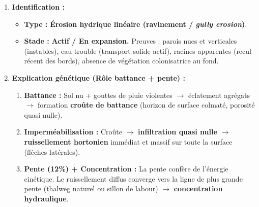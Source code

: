 \documentclass[11pt]{article}
\begin{document}
\begin{exoresolu}
\begin{enumerate}
\begin{itemize}
            \item \textbf{Surface :} Horizon supérieur (0 à -0,5 m) uniforme, colorié en orange (sol ferrugineux), sans végétation visible (« Sol nu »), mention « croûte de battance ».
            \item \textbf{Forme centrale :} Une incision symétrique en « V » large (environ 2 m au sommet) et profonde (1,5 m), aux parois nues, verticales à sub-verticales.
            \item \textbf{Fond :} Présence d'eau bleue trouble (chargée en sédiments) et de graviers/galets.
            \item   \textbf{Flèches bleues :} Convergence du ruissellement depuis les bords vers le centre (concentration).
            \item \textbf{Détails :} Racines d'arbres/herbes sectionnées et apparentes sur les bords supérieurs de la ravine (témoins du niveau initial du sol).
        \end{itemize}
        \item \textbf{Identification :}
        \begin{itemize}
            \item \textbf{Type :} \textbf{Érosion hydrique linéaire (ravinement / \emph{gully erosion})}.
            \item \textbf{Stade :} \textbf{Actif / En expansion.} Preuves : parois nues et verticales (instables), eau trouble (transport solide actif), racines apparentes (recul récent des bords), absence de végétation colonisatrice au fond.
        \end{itemize}
        \item \textbf{Explication génétique (Rôle battance + pente) :}
        \begin{enumerate}
            \item \textbf{Battance :} Sol nu + gouttes de pluie violentes $\rightarrow$ éclatement agrégats $\rightarrow$ formation \textbf{croûte de battance} (horizon de surface colmaté, porosité quasi nulle).
            \item \textbf{Imperméabilisation :} Croûte $\rightarrow$ \textbf{infiltration quasi nulle} $\rightarrow$ \textbf{ruissellement hortonien} immédiat et massif sur toute la surface (flèches latérales).
            \item \textbf{Pente (12\%) + Concentration :} La pente confère de l'énergie cinétique. Le ruissellement diffus converge vers la ligne de plus grande pente (thalweg naturel ou sillon de labour) $\rightarrow$ \textbf{concentration hydraulique}.

\end{enumerate}
\end{enumerate}
\end{exoresolu}
\end{document}
